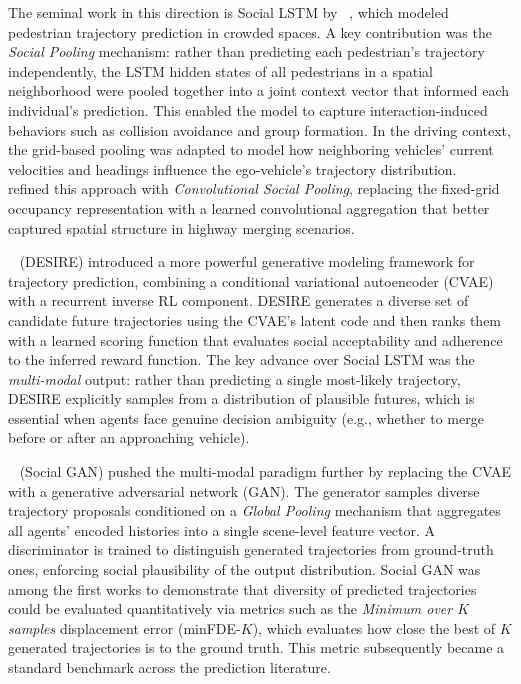 \documentclass[12pt, a4paper]{article}
\begin{document}
The seminal work in this direction is Social LSTM by
\citeauthor{alahi2016social}~\cite{alahi2016social}, which modeled pedestrian
trajectory prediction in crowded spaces.  A key contribution was the
\emph{Social Pooling} mechanism: rather than predicting each pedestrian's
trajectory independently, the LSTM hidden states of all pedestrians in a
spatial neighborhood were pooled together into a joint context vector that
informed each individual's prediction.  This enabled the model to capture
interaction-induced behaviors such as collision avoidance and group formation.
In the driving context, the grid-based pooling was adapted to model how
neighboring vehicles' current velocities and headings influence the ego-vehicle's
trajectory distribution.  \citeauthor{deo2018convolutional}~\cite{deo2018convolutional}
refined this approach with \emph{Convolutional Social Pooling}, replacing the
fixed-grid occupancy representation with a learned convolutional aggregation
that better captured spatial structure in highway merging scenarios.

\citeauthor{lee2017desire}~\cite{lee2017desire} (DESIRE) introduced a
more powerful generative modeling framework for trajectory prediction,
combining a conditional variational autoencoder (CVAE) with a recurrent
inverse RL component.  DESIRE generates a diverse set of candidate future
trajectories using the CVAE's latent code and then ranks them with a
learned scoring function that evaluates social acceptability and adherence
to the inferred reward function.  The key advance over Social LSTM was the
\emph{multi-modal} output: rather than predicting a single most-likely
trajectory, DESIRE explicitly samples from a distribution of plausible
futures, which is essential when agents face genuine decision ambiguity
(e.g., whether to merge before or after an approaching vehicle).

\citeauthor{gupta2018social}~\cite{gupta2018social} (Social GAN) pushed the
multi-modal paradigm further by replacing the CVAE with a generative
adversarial network (GAN).  The generator samples diverse trajectory
proposals conditioned on a \emph{Global Pooling} mechanism that aggregates
all agents' encoded histories into a single scene-level feature vector.
A discriminator is trained to distinguish generated trajectories from
ground-truth ones, enforcing social plausibility of the output distribution.
Social GAN was among the first works to demonstrate that diversity of
predicted trajectories could be evaluated quantitatively via metrics such as
the \emph{Minimum over $K$ samples} displacement error (minFDE-$K$), which
evaluates how close the best of $K$ generated trajectories is to the
ground truth.  This metric subsequently became a standard benchmark
across the prediction literature.
\end{document}
